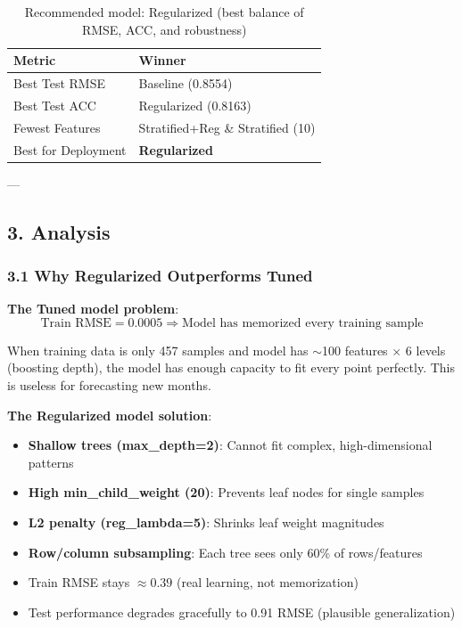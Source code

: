 \documentclass[12pt,a4paper]{article}
\begin{document}
\begin{table}[H]
\centering
\begin{tabular}{ll}
\toprule
\textbf{Metric} & \textbf{Winner} \\
\midrule
Best Test RMSE & Baseline (0.8554) \\
Best Test ACC & Regularized (0.8163) \\
Fewest Features & Stratified+Reg \& Stratified (10) \\
Best for Deployment & \textbf{Regularized} \\
\bottomrule
\end{tabular}
\caption{Recommended model: Regularized (best balance of RMSE, ACC, and robustness)}
\end{table}

---

\subsection*{3. Analysis}

\subsubsection*{3.1 Why Regularized Outperforms Tuned}

\textbf{The Tuned model problem}:
\begin{equation}
\text{Train RMSE} = 0.0005 \Rightarrow \text{Model has memorized every training sample}
\end{equation}

When training data is only 457 samples and model has $\sim$100 features $\times$ 6 levels (boosting depth), the model has enough capacity to fit every point perfectly. This is useless for forecasting new months.

\textbf{The Regularized model solution}:
\begin{itemize}
    \item \textbf{Shallow trees (max\_depth=2)}: Cannot fit complex, high-dimensional patterns
    \item \textbf{High min\_child\_weight (20)}: Prevents leaf nodes for single samples
    \item \textbf{L2 penalty (reg\_lambda=5)}: Shrinks leaf weight magnitudes
    \item \textbf{Row/column subsampling}: Each tree sees only 60\% of rows/features
    \item Train RMSE stays $\approx 0.39$ (real learning, not memorization)
    \item Test performance degrades gracefully to 0.91 RMSE (plausible generalization)
\end{itemize}
\end{document}

